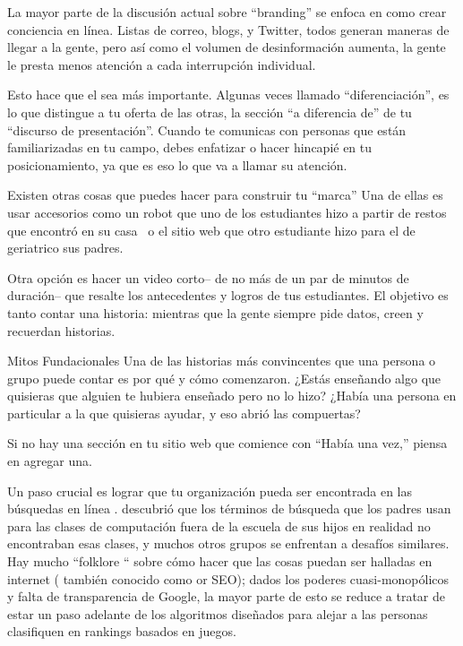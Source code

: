 La mayor parte de la discusión actual sobre “branding” se enfoca 
en como crear conciencia en línea.
Listas de correo,
blogs,
y Twitter, todos generan maneras de llegar a la gente,
pero así como el volumen de desinformación aumenta,
la gente le presta menos atención a cada interrupción individual.

Esto hace que el  sea más importante.
Algunas veces llamado “diferenciación”,
es lo que distingue a tu oferta de las otras, la sección “a diferencia de” de tu “discurso de presentación”.
Cuando te comunicas con personas que están familiarizadas en tu campo,
debes enfatizar o hacer hincapié en tu posicionamiento,
ya que es eso lo que va a llamar su atención.


Existen otras cosas que puedes hacer para construir tu “marca”
Una de ellas es usar accesorios como un robot que uno de los estudiantes hizo a partir de restos que encontró en su casa~\cite{Schw2013}
o el sitio web que otro estudiante hizo para el de geriatrico sus padres.

Otra opción es hacer un video corto-- de no más de un par de minutos de duración--
que resalte los antecedentes y logros de tus estudiantes.
El objetivo es tanto contar una historia:
mientras que la gente siempre pide datos,
creen y recuerdan historias.


\begin{aside}{Mitos Fundacionales}
 Una de las historias más convincentes que una persona o grupo puede contar es
por qué y cómo comenzaron.
¿Estás enseñando algo que quisieras que alguien te hubiera enseñado pero no lo hizo?
¿Había una persona en particular a la que quisieras ayudar,
y eso abrió las compuertas?

Si no hay una sección en tu sitio web que comience con “Había una vez,”
piensa en agregar una.

\end{aside}

Un paso crucial es lograr que tu organización pueda ser encontrada en las búsquedas en línea .
\cite{DiSa2014b} descubrió que
los términos de búsqueda que los padres usan para las clases de computación fuera de la escuela de sus hijos
en realidad no encontraban esas clases,
y muchos otros grupos se enfrentan a desafíos similares.
Hay mucho “folklore “ sobre cómo hacer que las cosas puedan ser halladas en internet 
( también conocido como or SEO);
dados los  poderes cuasi-monopólicos y falta de transparencia de Google,
la mayor parte de esto se reduce a tratar de estar un paso adelante de los 
algoritmos diseñados para alejar a las personas clasifiquen en rankings basados en juegos.

